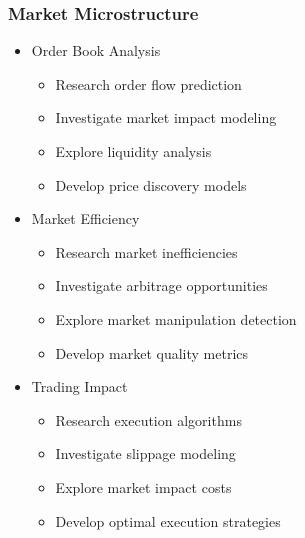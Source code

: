 \documentclass[conference]{IEEEtran}
\begin{document}
\subsubsection{Market Microstructure}
\begin{itemize}
    \item Order Book Analysis
    \begin{itemize}
        \item Research order flow prediction
        \item Investigate market impact modeling
        \item Explore liquidity analysis
        \item Develop price discovery models
    \end{itemize}
    
    \item Market Efficiency
    \begin{itemize}
        \item Research market inefficiencies
        \item Investigate arbitrage opportunities
        \item Explore market manipulation detection
        \item Develop market quality metrics
    \end{itemize}
    
    \item Trading Impact
    \begin{itemize}
        \item Research execution algorithms
        \item Investigate slippage modeling
        \item Explore market impact costs
        \item Develop optimal execution strategies
    \end{itemize}
\end{itemize}
\end{document}
